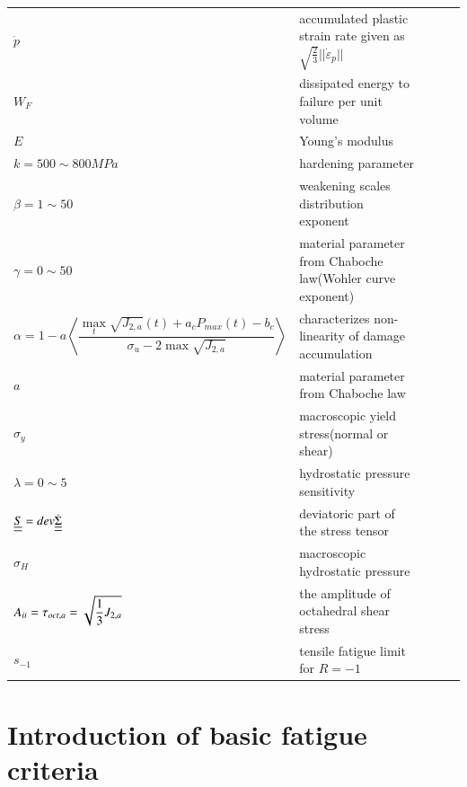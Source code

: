 \documentclass[3p,times,procedia,number]{elsarticle}
\begin{document}
\begin{flushleft}
\begin{table}[h]
\begin{tabular}{lllll}
						$\dot{p}$ & accumulated plastic strain rate given as $\sqrt{\frac{2}{3}}||\dot{\varepsilon}_p||$ &  &  &  \\
						$W_F$ & dissipated energy to failure per unit volume &  &  &  \\
						$E$ & Young's modulus &  &  &  \\
						$k=500\sim800MPa$ & hardening parameter &  &  &  \\
						$\beta=1\sim50$ & weakening scales distribution exponent  &  &  &  \\
						$\gamma=0\sim50$ & material parameter from Chaboche law(Wohler curve exponent)  &  &  &  \\
						$\alpha=1 - a\left\langle \dfrac{\max\limits_{t}\sqrt{J_{2,a}}(t)+a_c{P_{max}(t)}-b_c}{ \sigma_{u} - 2\max\sqrt{J_{2,a}}}\right\rangle$ & characterizes non-linearity of damage accumulation &  &  &  \\
						$a$ & material parameter from Chaboche law &  &  &  \\
						$\sigma_{y}$ & macroscopic yield stress(normal or shear) &  &  &  \\
						$\lambda=0\sim5$& hydrostatic pressure sensitivity &  &  &  \\
		             	$\uline{\uline{S}}=dev\dot{\uline{\uline{\Sigma}}}$ & deviatoric part of the stress tensor &  &  &  \\
						$\sigma_H$& macroscopic hydrostatic pressure &  &  &  \\
						$A_{\uppercase\expandafter{\romannumeral2}}=\tau_{oct,a}=\sqrt{\dfrac{1}{3}J_{2,a}}$& the amplitude of octahedral shear stress &  &  &  \\
						$s_{-1}$& tensile fatigue limit for $R=-1$  &  &  &  \\
		\end{tabular}
	\end{table}
\end{flushleft}

\clearpage

\section{Introduction of basic fatigue criteria}
\end{document}
